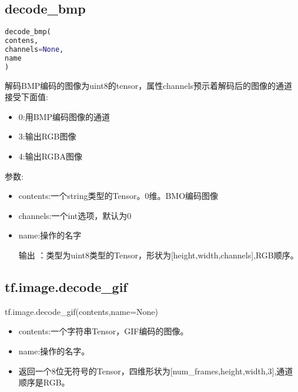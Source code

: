 {\subsection{decode\_bmp}
\begin{lstlisting}[language=Python]
decode_bmp(
contens,
channels=None,
name 
)
\end{lstlisting}
解码BMP编码的图像为uint8的tensor，属性channels预示着解码后的图像的通道
接受下面值:
\begin{itemize}
		\item 0:用BMP编码图像的通道
		\item 3:输出RGB图像
		\item 4:输出RGBA图像
\end{itemize}
参数:
\begin{itemize}
		\item contents:一个string类型的Tensor。0维。BMO编码图像
		\item channels:一个int选项，默认为0
		\item name:操作的名字
		\item[输出]：类型为uint8类型的Tensor，形状为[height,width,channels],RGB顺序。
\end{itemize}
\subsection{tf.image.decode\_gif}
tf.image.decode\_gif(contents,name=None)
\begin{itemize}
\item contents:一个字符串Tensor，GIF编码的图像。
\item name:操作的名字。
\item 返回一个8位无符号的Tensor，四维形状为[num\_frames,height,width,3],通道顺序是RGB。
\end{itemize}
}
